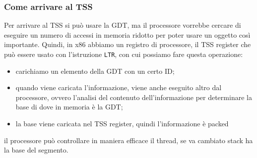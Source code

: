 \documentclass[12pt, oneside]{extbook}
\begin{document}
\subsubsection{Come arrivare al TSS}
Per arrivare al TSS si può usare la GDT, ma il processore vorrebbe cercare di eseguire un numero di accessi in memoria ridotto per poter usare un oggetto così importante. Quindi, in x86 abbiamo un registro di processore, il TSS register che può essere usato con l'istruzione \texttt{LTR}, con cui possiamo fare questa operazione:
\begin{itemize}
\item carichiamo un elemento della GDT con un certo ID;
\item quando viene caricata l'informazione, viene anche eseguito altro dal processore, ovvero l'analisi del contenuto dell'informazione per determinare la base di dove in memoria è la GDT;
\item la base viene caricata nel TSS register, quindi l'informazione è packed
\end{itemize}
il processore può controllare in maniera efficace il thread, se va cambiato stack ha la base del segmento.
\end{document}
